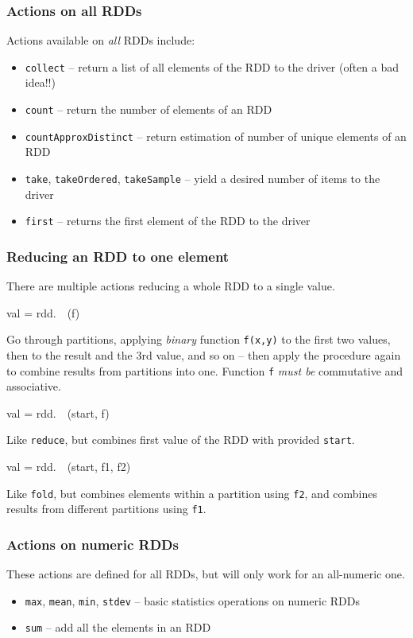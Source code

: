 \documentclass[english,serif,mathserif]{beamer}
\begin{document}
\begin{frame}[fragile]
  \frametitle{Actions on all RDDs}

Actions available on \emph{all} RDDs include:
\begin{itemize}
\item
  \lstinline!collect! -- return a list of all elements of the RDD to the driver
  (often a bad idea!!)
\item
  \lstinline!count! -- return the number of elements of an RDD
\item
  \lstinline!countApproxDistinct! -- return estimation of number of unique elements of an RDD
\item
  \lstinline!take!, \lstinline!takeOrdered!, \texttt{takeSample} -- yield a desired number of items to the driver
\item
  \lstinline!first! -- returns the first element of the RDD to the driver
\end{itemize}
\end{frame}


\begin{frame}[fragile]
  \frametitle{Reducing an RDD to one element}

  There are multiple actions reducing a whole RDD to a single value.
  \smaller

  \+
\begin{python}
val = rdd.~~(f)
\end{python}
  Go through partitions, applying \emph{binary} function
  \texttt{f(x,y)} to the first two values, then to the result and the
  3rd value, and so on -- then apply the procedure again to combine
  results from partitions into one.  Function \texttt{f} \emph{must be}
  commutative and associative.

  \+
\begin{python}
val = rdd.~~(start, f)
\end{python}
  Like \texttt{reduce}, but combines first value of the RDD with provided \texttt{start}.

  \+
\begin{python}
val = rdd.~~(start, f1, f2)
\end{python}
  Like \texttt{fold}, but combines elements within a partition using
  \texttt{f2}, and combines results from different partitions using
  \texttt{f1}.
\end{frame}


\begin{frame}[fragile]
  \frametitle{Actions on numeric RDDs}

  These actions are defined for all RDDs, but will only work for an all-numeric one.

\begin{itemize}
\item
  \texttt{max}, \texttt{mean}, \texttt{min}, \texttt{stdev} -- basic statistics operations on numeric RDDs
\item
  \texttt{sum} -- add all the elements in an RDD
\end{itemize}
\end{frame}
\end{document}

